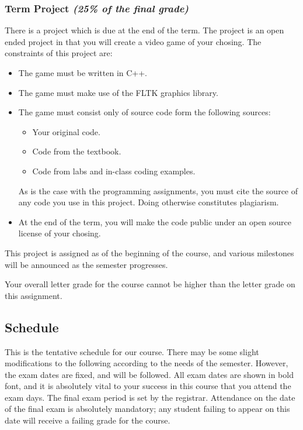 \documentclass[11pt]{article}
\begin{document}
\subsubsection*{Term Project {\em (25\% of the final grade)}}
There is a project which is due at the end of the term.  The project
is an open ended project in that you will create a video game of your
chosing.  The constraints of this project are:
\begin{itemize}
    \item The game must be written in C++.
    \item The game must make use of the FLTK graphics library.
    \item The game must consist only of source code form the following
        sources:
        \begin{itemize}
            \item Your original code.
            \item Code from the textbook.
            \item Code from labs and in-class coding examples.
        \end{itemize}
        As is the case with the programming assignments, you must cite
        the source of any code you use in this project. Doing
        otherwise constitutes plagiarism.

    \item At the end of the term, you will make the code public under
        an open source license of your chosing.
\end{itemize}
This project is assigned as of the beginning of the course, and
various milestones will be announced as the semester progresses. 

Your overall letter grade for the course cannot be higher than the letter
grade on this assignment.




\subsection*{Schedule}
This is the tentative schedule for our course.  There may be some
slight modifications to the following according to the needs of the
semester. However, the exam dates are fixed, and will be followed.
All exam dates are shown in bold font, and it is absolutely vital to
your success in this course that you attend the exam days.  The final
exam period is set by the registrar.  Attendance on the date of the
final exam is absolutely mandatory; any student failing to appear on
this date will receive a failing grade for the course.
\end{document}

